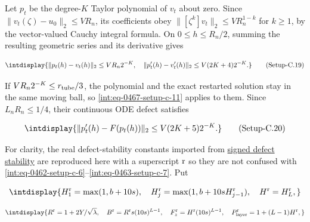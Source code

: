 Let \(p_t\) be the degree-\(K\) Taylor polynomial of \(v_t\) about zero. Since \(\|v_t(\zeta)-u_0\|_2\le VR_n\), its coefficients obey \(\|[\zeta^k]v_t\|_2\le VR_n^{1-k}\) for \(k\ge1\), by the vector-valued Cauchy integral formula. On \(0\le h\le R_n/2\), summing the resulting geometric series and its derivative gives


\label{int:eq-setup-c-19}
\begingroup\renewcommand{\theHequation}{intdisplay.943}
\begin{equation}
\intdisplay{
\|p_t(h)-v_t(h)\|_2\le VR_n2^{-K},
\quad
\|p_t'(h)-v_t'(h)\|_2\le V(2K+4)2^{-K}.
}
\tag{Setup-C.19}
\label{int:eq-0475-setup-c-19}
\end{equation}
\endgroup


If \(VR_n2^{-K}\le r_{\rm tube}/3\), the polynomial and the exact restarted solution stay in the same moving ball, so \hyperref[int:eq-setup-c-11]{\eqref{int:eq-0467-setup-c-11}} applies to them. Since \(L_nR_n\le1/4\), their continuous ODE defect satisfies


\label{int:eq-setup-c-20}
\begingroup\renewcommand{\theHequation}{intdisplay.944}
\begin{equation}
\intdisplay{
\|p_t'(h)-F(p_t(h))\|_2
\le V(2K+5)2^{-K}.
}
\tag{Setup-C.20}
\label{int:eq-0476-setup-c-20}
\end{equation}
\endgroup


For clarity, the real defect-stability constants imported from \hyperref[int:setup-stability]{signed defect stability} are reproduced here with a superscript \({\rm r}\) so they are not confused with \hyperref[int:eq-setup-c-6]{\eqref{int:eq-0462-setup-c-6}}--\allowbreak \hyperref[int:eq-setup-c-7]{\eqref{int:eq-0463-setup-c-7}}. Put


\begingroup\renewcommand{\theHequation}{intdisplay.945}
\begin{equation*}
\intdisplay{
H_1^{\rm r}=\max(1,b+10s),\quad
H_j^{\rm r}=\max(1,b+10sH_{j-1}^{\rm r}),\quad H^{\rm r}=H_L^{\rm r},
}
\end{equation*}
\endgroup

\begingroup\renewcommand{\theHequation}{intdisplay.946}
\begin{equation*}
\intdisplay{
R^{\rm r}=1+2Y/\sqrt\lambda,\quad
B^{\rm r}=R^{\rm r}s(10s)^{L-1},\quad
F_z^{\rm r}=H^{\rm r}(10s)^{L-1},\quad
P^{\rm r}_{\rm layer}=1+(L-1)H^{\rm r},
}
\end{equation*}
\endgroup

